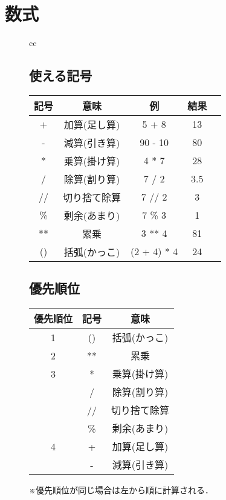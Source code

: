 \documentclass{jsarticle}
\begin{document}
\section{数式} \vspace{-5mm}
\begin{figure}[ht]
	\begin{tabular}{cc}
		\begin{minipage}{.6\textwidth}
			\subsection{使える記号} \vspace{-5mm}
			\begin{tabular}[t]{|c|c|c|c|c|}
				\hline
				記号 & 意味         & 例          & 結果 \\
				\hline \hline
				+    & 加算(足し算) & 5 + 8       & 13   \\ \hline
				-    & 減算(引き算) & 90 - 10     & 80   \\ \hline
				*    & 乗算(掛け算) & 4 * 7       & 28   \\ \hline
				/    & 除算(割り算) & 7 / 2       & 3.5  \\ \hline
				//   & 切り捨て除算 & 7 // 2      & 3    \\ \hline
				\%   & 剰余(あまり) & 7 \% 3      & 1    \\ \hline
				**   & 累乗         & 3 ** 4      & 81   \\ \hline
				()   & 括弧(かっこ) & (2 + 4) * 4 & 24   \\ \hline
			\end{tabular}
		\end{minipage}
		\hspace{-10mm}
		\begin{minipage}{.5\textwidth}
			\subsection{優先順位} \vspace{-4mm}
			\begin{tabular}[t]{|c|c|c|}
				\hline
				優先順位 & 記号 & 意味         \\
				\hline \hline
				1        & ()   & 括弧(かっこ) \\ \hline
				2        & **   & 累乗         \\ \hline
				3        & *    & 乗算(掛け算) \\ \hline
				         & /    & 除算(割り算) \\ \hline
				         & //   & 切り捨て除算 \\ \hline
				         & \%   & 剰余(あまり) \\ \hline
				4        & +    & 加算(足し算) \\ \hline
				         & -    & 減算(引き算) \\ \hline
			\end{tabular}
			\par
			※優先順位が同じ場合は左から順に計算される．
		\end{minipage}
	\end{tabular}
\end{figure}
\end{document}
